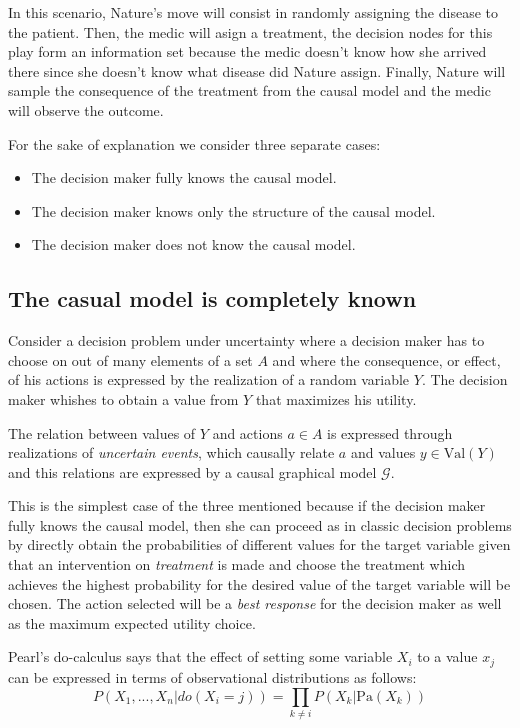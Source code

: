 \documentclass{article}
\begin{document}
In this scenario, Nature's move will consist in randomly assigning the disease to the patient. Then, the medic will asign a treatment, the decision nodes for this play form an information set because the medic doesn't know how she arrived there since she doesn't know what disease did Nature assign. Finally, Nature will sample the consequence of the treatment from the causal model and the medic will observe the outcome.

For the sake of explanation we consider three separate cases:
\begin{itemize}
\item The decision maker fully knows the causal model.
\item The decision maker knows only the structure of the causal model.
\item The decision maker does not know the causal model.
\end{itemize}

\subsection{The casual model is completely known}
Consider a decision problem under uncertainty where a decision maker has to choose on out of many elements of a set $A$ and where the consequence, or effect, of his actions is expressed by the realization of a random variable $Y$. The decision maker whishes to obtain a value from $Y$ that maximizes his utility. 

The relation between values of $Y$ and actions $a \in A$ is expressed through realizations of \textit{uncertain events}, which causally relate $a$ and values $y \in \textrm{Val}(Y)$ and this relations are expressed by a causal graphical model $\mathcal{G}$.

This is the simplest case of the three mentioned because if the decision maker fully knows the causal model, then she can proceed as in classic decision problems by directly obtain the probabilities of different values for the target variable given that an intervention on \textit{treatment} is made and choose the treatment which achieves the highest probability for the desired value of the target variable will be chosen. The action selected will be a \textit{best response} for the decision maker as well as the maximum expected utility choice.

Pearl's  do-calculus \cite{pearl2009causality} says that the effect of setting some variable $X_i$ to a value $x_j$ can be expressed in terms of observational distributions as follows:
\[ P(X_1,...,X_n | do(X_i = j )) = \prod_{k \neq i} P(X_k | \textrm{Pa}(X_k)) \] 
\end{document}
